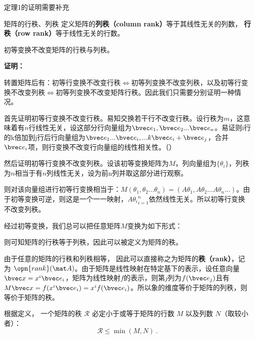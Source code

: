 
\begin{issues}
\issueDraft 定理1的证明需要补充
\end{issues}


\begin{definition}{矩阵的行秩、列秩}
定义矩阵的\textbf{列秩（column rank）}等于其线性无关的列数， \textbf{行秩（row rank）}等于线性无关的行数。
\end{definition}
\begin{theorem}{}
初等变换不改变矩阵的行秩与列秩。
\end{theorem}
\textbf{证明：}

转置矩阵后有：初等行变换不改变行秩$\Leftrightarrow$初等列变换不改变列秩，以及初等行变换不改变列秩$\Leftrightarrow$初等列变换不改变矩阵行秩。因此我们只需要分别证明一种情况。

首先证明初等行变换不改变行秩。易知交换若干行不改变行秩。设行秩为$m$，这意味着有$n$行线性无关，设这部分行向量组为$\bvec e_1,\bvec e_2...\bvec e_n$。易证则i行的k倍加到j行后行向量组为$\bvec e_1...\bvec e_i,...k\bvec e_i+\bvec e_j$，合并$\bvec e_i$项，则行变换不改变行向量组的线性相关性。（）

然后证明初等行变换不改变列秩。设该初等变换矩阵为$M$，列向量组为$\{\theta_i\}$，列秩为$n$相当于有$n$列线性无关，设为前n列并取这部分进行观察。

则对该向量组进行初等行变换相当于：$M(\theta_1,\theta_2...\theta_n)=(A\theta_1,A\theta_2...A\theta_n...)$。由于初等变换可逆，则这是一个一一映射，${A\theta_i}_{i=1}^n$依然线性无关。所以初等行变换不改变列秩。

经过初等变换，我们总可以把任意矩阵$M$变换为如下形式：


则可知矩阵的行秩等于列秩，因此可以被定义为矩阵的秩。

\begin{definition}{}
由于任意的矩阵的行秩和列秩相等， 因此可以直接称之为矩阵的\textbf{秩（rank）}，记为 $\opn{rank}(\mat A)$。由于矩阵是线性映射在特定基下的表示，设任意向量$\bvec x=x^i\bvec e_i$，矩阵为线性映射$f$的表示，则第$j$列为$f(\bvec e_j)$且有$M\bvec x=f(x^i\bvec  e_i)=x^if(\bvec e_i)$。所以象的维度等价于矩阵的列秩，则等价于矩阵的秩。
\end{definition}




\begin{theorem}{}
根据定义， 一个矩阵的秩 $\mathcal R$ 必定小于或等于矩阵的行数 $M$ 以及列数 $N$（取较小者）：
\begin{equation}
\mathcal R\leq \min (M, N)~.
\end{equation}
\end{theorem}

